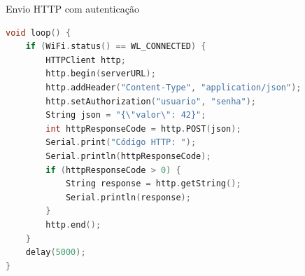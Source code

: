\begin{frame}[fragile]{Envio HTTP com autenticação}
\begin{lstlisting}[language=C, basicstyle=\tiny\ttfamily]
void loop() {
    if (WiFi.status() == WL_CONNECTED) {
        HTTPClient http;
        http.begin(serverURL);
        http.addHeader("Content-Type", "application/json");
        http.setAuthorization("usuario", "senha");
        String json = "{\"valor\": 42}";
        int httpResponseCode = http.POST(json);
        Serial.print("Código HTTP: ");
        Serial.println(httpResponseCode);
        if (httpResponseCode > 0) {
            String response = http.getString();
            Serial.println(response);
        }
        http.end();
    }
    delay(5000);    
}
\end{lstlisting}
    \end{frame}
        
        